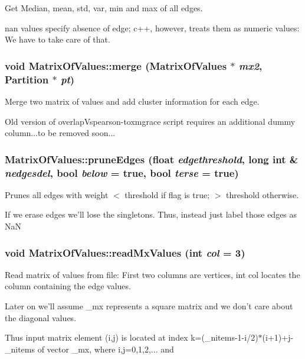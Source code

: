 Get Median, mean, std, var, min and max of all edges. 

nan values specify absence of edge; c++, however, treats them as numeric values: We have to take care of that. 
\subsubsection{\setlength{\rightskip}{0pt plus 5cm}void Matrix\-Of\-Values::merge ({\bf Matrix\-Of\-Values} $\ast$ {\em mx2}, {\bf Partition} $\ast$ {\em pt})}\label{classMatrixOfValues_a19}


Merge two matrix of values and add cluster information for each edge. 

Old version of overlap\-Vspearson-toxmgrace script requires an additional dummy column...to be removed soon... 
\subsubsection{ Matrix\-Of\-Values::prune\-Edges (float {\em edgethreshold}, long int \& {\em nedgesdel}, bool {\em below} = true, bool {\em terse} = true)}\label{classMatrixOfValues_a8}


Prunes all edges with weight $<$ threshold if flag is true; $>$ threshold otherwise. 

If we erase edges we'll lose the singletons. Thus, instead just label those edges as Na\-N 
\subsubsection{\setlength{\rightskip}{0pt plus 5cm}void Matrix\-Of\-Values::read\-Mx\-Values (int {\em col} = 3)}\label{classMatrixOfValues_a13}


Read matrix of values from file: First two columns are vertices, int col locates the column containing the edge values. 

Later on we'll assume \_\-mx represents a square matrix and we don't care about the diagonal values. 

Thus input matrix element (i,j) is located at index k=(\_\-nitems-1-i/2)$\ast$(i+1)+j-\_\-nitems of vector \_\-mx, where i,j=0,1,2,... and 
